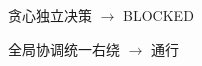 \begin{subfigure}[b]{0.48\textwidth}
  \centering
  \caption{贪心独立决策 $\to$ BLOCKED}
\end{subfigure}\hfill
\begin{subfigure}[b]{0.48\textwidth}
  \centering
  \caption{全局协调统一右绕 $\to$ 通行}
\end{subfigure}
